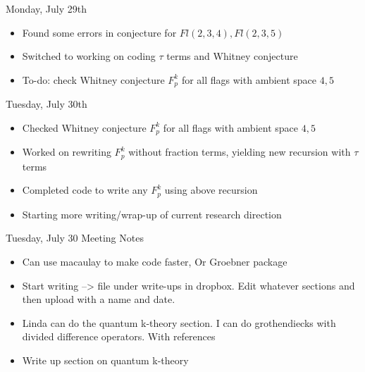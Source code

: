 Monday, July 29th
\begin{itemize}
    \item Found some errors in conjecture for $Fl(2, 3, 4), Fl(2, 3, 5)$
    \item Switched to working on coding $\tau$ terms and Whitney conjecture
    \item To-do: check Whitney conjecture $F_p^k$ for all flags with ambient space $4, 5$
\end{itemize}

Tuesday, July 30th
\begin{itemize}
    \item Checked Whitney conjecture $F_p^k$ for all flags with ambient space $4, 5$
    \item Worked on rewriting $F_p^k$ without fraction terms, yielding new recursion with $\tau$ terms
    \item Completed code to write any $F_p^k$ using above recursion
    \item Starting more writing/wrap-up of current research direction
\end{itemize}

Tuesday, July 30 Meeting Notes
\begin{itemize}
    \item Can use macaulay to make code faster, Or Groebner package
    \item Start writing --> file under write-ups in dropbox. Edit whatever sections and then upload with a name and date. 
    \item Linda can do the quantum k-theory section. I can do grothendiecks with divided difference operators. With references
    \item Write up section on quantum k-theory 
\end{itemize}